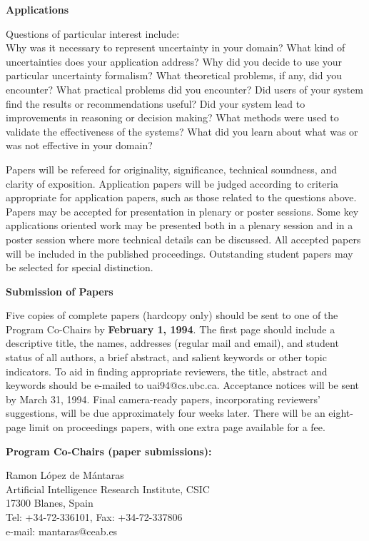 {\bf %
 Applications}

 Questions of particular interest include:\\
Why was it necessary to represent uncertainty in your domain?
What kind of uncertainties does your application address?
Why did you decide to use your particular uncertainty formalism?
What theoretical problems, if any, did you encounter?
What practical problems did you encounter?
Did users of your system find the results or recommendations useful?
Did your system lead to improvements in reasoning
    or decision making?
What methods were used to validate the effectiveness of the systems?
What did you learn about what was or was not effective in your domain?

Papers will be refereed for originality, significance, technical
soundness, and clarity of exposition. Application papers will be
judged according to criteria appropriate for application papers, such
as those related to the questions above.  Papers may be accepted for
presentation in plenary or poster sessions.  Some key applications
oriented work may be presented both in a plenary session and in a
poster session where more technical details can be discussed.  All
accepted papers will be included in the published proceedings.
Outstanding student papers may be selected for special distinction.

{\bf Submission of Papers}

Five copies of complete papers (hardcopy only) should be sent to one
of the Program Co-Chairs by {\bf February 1, 1994}.  The first page
should include a descriptive title, the names, addresses (regular mail
and email), and student status of all authors, a brief abstract, and
salient keywords or other topic indicators. To aid in finding
appropriate reviewers, the title, abstract and keywords should be
e-mailed to {\sf uai94@cs.ubc.ca}. Acceptance notices will be sent by
March 31, 1994.  Final camera-ready papers, incorporating reviewers'
suggestions, will be due approximately four weeks later.  There will
be an eight-page limit on proceedings papers, with one extra page
available for a fee.

{\bf Program Co-Chairs (paper submissions):}

Ramon L\'opez de M\'antaras\\
Artificial Intelligence Research Institute, CSIC\\
17300 Blanes, Spain\\
Tel: +34-72-336101,
Fax: +34-72-337806\\
e-mail: mantaras@ceab.es

